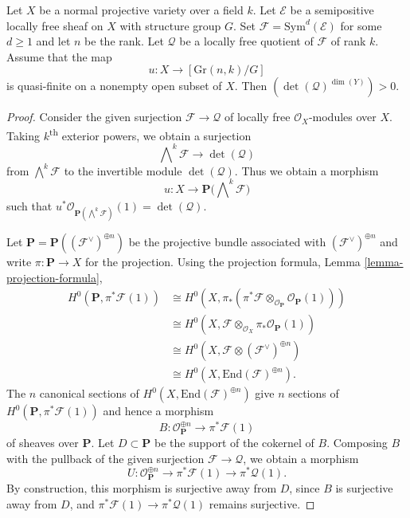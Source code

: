 \begin{lemma}
\label{lemma-positive-self-intersection}
Let $X$ be a normal projective variety over a field $k$.
Let $\mathcal{E}$ be a semipositive locally free sheaf on $X$ with structure
group $G$.
Set $\mathcal{F} = \mathrm{Sym}^d(\mathcal{E})$ for some $d \geq 1$ and let $n$
be the rank.
Let $\mathcal{Q}$ be a locally free quotient of $\mathcal{F}$ of rank $k$.
Assume that the map
$$
u : X \to [\mathrm{Gr}(n,k)/G]
$$
is quasi-finite on a nonempty open subset of $X$.
Then $(\det(\mathcal{Q})^{\dim(Y)}) > 0$.
\end{lemma}

\begin{proof}
Consider the given surjection $\mathcal{F} \to \mathcal{Q}$ of locally free
$\mathcal{O}_X$-modules over $X$.
Taking $k$\textsuperscript{th} exterior powers, we obtain a surjection
$$
  \bigwedge\nolimits^k \mathcal{F} \to \det(\mathcal{Q})
$$
from $\bigwedge^k\mathcal{F}$ to the invertible module $\det(\mathcal{Q})$.
Thus we obtain a morphism
$$
  u : X \to \mathbf{P}\big(\bigwedge\nolimits^k \mathcal{F}\big)
$$
such that
$u^*\mathcal{O}_{\mathbf{P}(\bigwedge^k\mathcal{F})}(1) = \det(\mathcal{Q})$.

Let $\mathbf{P} = \mathbf{P}((\mathcal{F}^\vee)^{\oplus n})$ be the projective
bundle associated with $(\mathcal{F}^\vee)^{\oplus n}$ and write
$\pi : \mathbf{P} \to X$ for the projection.
Using the projection formula, Lemma \ref{lemma-projection-formula},
\begin{align*}
H^0(\mathbf{P}, \pi^*\mathcal{F}(1))
  & \cong
H^0(X, \pi_*(\pi^*\mathcal{F} \otimes_{\mathcal{O}_{\mathbf{P}}}
  \mathcal{O}_{\mathbf{P}}(1))) \\
  & \cong
H^0(X,\mathcal{F} \otimes_{\mathcal{O}_X} \pi_*\mathcal{O}_{\mathbf{P}}(1)) \\
  & \cong
H^0(X,\mathcal{F} \otimes (\mathcal{F}^\vee)^{\oplus n}) \\
  & \cong
H^0(X,\mathrm{End}(\mathcal{F})^{\oplus n}).
\end{align*}
The $n$ canonical sections of $H^0(X,\mathrm{End}(\mathcal{F})^{\oplus n})$
give $n$ sections of
$H^0(\mathbf{P}, \pi^*\mathcal{F}(1))$ and hence
a morphism
$$
  B : \mathcal{O}_{\mathbf{P}}^{\oplus n} \to \pi^*\mathcal{F}(1)
$$
of sheaves over $\mathbf{P}$.
Let $D \subset \mathbf{P}$ be the support of the cokernel of $B$.
Composing $B$ with the pullback of the given surjection
$\mathcal{F} \to \mathcal{Q}$, we obtain a morphism
$$
  U : \mathcal{O}_{\mathbf{P}}^{\oplus n} \to
        \pi^*\mathcal{F}(1) \to
        \pi^*\mathcal{Q}(1).
$$
By construction, this morphism is surjective away from $D$, since $B$ is surjective away from $D$, and $\pi^*\mathcal{F}(1)\to\pi^*\mathcal{Q}(1)$ remains surjective.



\end{proof}

